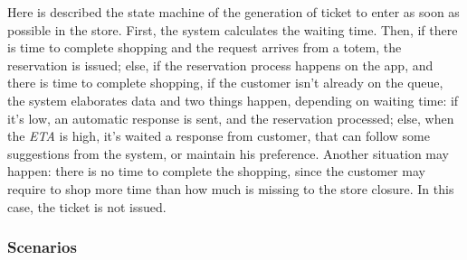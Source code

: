 \documentclass{article}
\begin{document}
		Here is described the state machine of the generation of ticket to enter as soon as possible in the store. First, the system calculates the waiting time. Then, if there is time to complete shopping and the request arrives from a totem, the reservation is issued; else, if the reservation process happens on the app, and there is time to complete shopping, if the customer isn't already on the queue, the system elaborates data and two things happen, depending on waiting time: if it's low, an automatic response is sent, and the reservation processed; else, when the \emph{ETA} is high, it's waited a response from customer, that can follow some suggestions from the system, or maintain his preference. Another situation may happen: there is no time to complete the shopping, since the customer may require to shop more time than how much is missing to the store closure. In this case, the ticket is not issued.

	\newpage
	\subsubsection{Scenarios}
	
\end{document}
